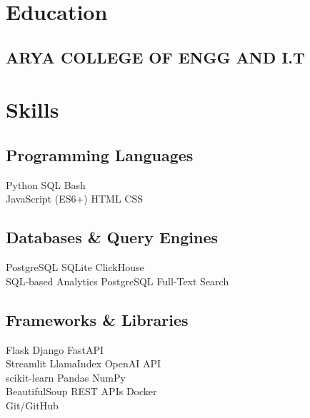 \documentclass[]{deedy-resume-reversed}
\begin{document}
\begin{minipage}[t]{0.33\textwidth}


\section{Education}

\subsection{ARYA COLLEGE OF ENGG AND I.T}
\sectionsep


\section{Skills}
\subsection{Programming Languages}
Python \textbullet{} SQL \textbullet{} Bash \\
JavaScript (ES6+) \textbullet{} HTML \textbullet{} CSS
\sectionsep

\subsection{Databases \& Query Engines}
PostgreSQL \textbullet{} SQLite \textbullet{} ClickHouse \\
SQL-based Analytics \textbullet{} PostgreSQL Full-Text Search
\sectionsep

\subsection{Frameworks \& Libraries}
Flask \textbullet{} Django \textbullet{} FastAPI \\
Streamlit \textbullet{} LlamaIndex \textbullet{} OpenAI API \\
scikit-learn \textbullet{} Pandas \textbullet{} NumPy \\
BeautifulSoup \textbullet{} REST APIs \textbullet{} Docker \\
Git/GitHub
\sectionsep


\end{minipage}
\end{document}
